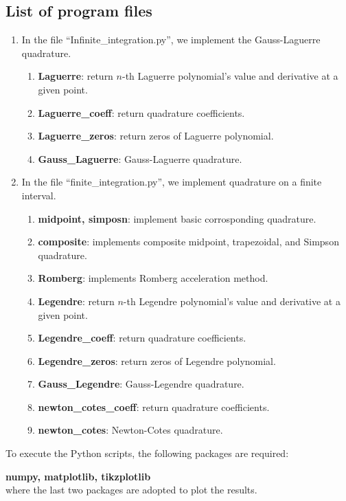 \documentclass[conference,onecolumn,12pt]{IEEEtran}
\theoremstyle{definition}
\begin{document}
\subsection{List of program files}
\begin{enumerate}
    \item In the file ``Infinite\_integration.py'', we implement the Gauss-Laguerre quadrature.
    \begin{enumerate}
        \item {\bf Laguerre}: return $n$-th Laguerre polynomial's value and derivative at a given point.
        \item {\bf Laguerre\_coeff}: return quadrature coefficients.
        \item {\bf Laguerre\_zeros}: return zeros of Laguerre polynomial.
        \item {\bf Gauss\_Laguerre}: Gauss-Laguerre quadrature.
    \end{enumerate}
    \item In the file ``finite\_integration.py'', we implement quadrature on a finite interval.
    \begin{enumerate}
        \item {\bf midpoint, simposn}: implement basic corrosponding quadrature.
        \item {\bf composite}: implements composite midpoint, trapezoidal, and Simpson quadrature.
        \item {\bf Romberg}: implements Romberg acceleration method.
        \item {\bf Legendre}: return $n$-th Legendre polynomial's value and derivative at a given point.
        \item {\bf Legendre\_coeff}: return quadrature coefficients.
        \item {\bf Legendre\_zeros}: return zeros of Legendre polynomial.
        \item {\bf Gauss\_Legendre}: Gauss-Legendre quadrature.
        \item {\bf newton\_cotes\_coeff}: return quadrature coefficients.
        \item {\bf newton\_cotes}: Newton-Cotes quadrature.
    \end{enumerate}
\end{enumerate}

To execute the Python scripts, the following packages are required:

{\bf numpy, matplotlib, tikzplotlib}\\
where the last two packages are adopted to plot the results. 
\end{document}
